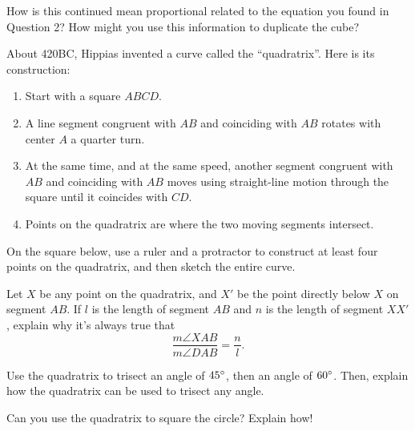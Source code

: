\documentclass[handout]{ximera}
\begin{document}
\begin{question}
How is this continued mean proportional related to the equation you found in Question 2?  How might you use this information to duplicate the cube?
\end{question}

\newpage

About 420BC, Hippias invented a curve called the ``quadratrix''.  Here is its construction:
\begin{enumerate}
    \item Start with a square $ABCD$.
    \item A line segment congruent with $AB$ and coinciding with $AB$ rotates with center $A$ a quarter turn.
    \item At the same time, and at the same speed, another segment congruent with $AB$ and coinciding with $AB$ moves using straight-line motion through the square until it coincides with $CD$.
    \item Points on the quadratrix are where the two moving segments intersect.
\end{enumerate}



\begin{question}
On the square below, use a ruler and a protractor to construct at least four points on the quadratrix, and then sketch the entire curve.
\begin{image}
\end{image}
\end{question}

\begin{question}
Let $X$ be any point on the quadratrix, and $X'$ be the point directly below $X$ on segment $AB$.  If $l$ is the length of segment $AB$ and $n$ is the length of segment $XX'$, explain why it's always true that 
\[
\frac{m\angle XAB}{m\angle DAB} = \frac{n}{l}.
\]
\end{question}

\begin{question}
Use the quadratrix to trisect an angle of $45\degree$, then an angle of $60\degree$.  Then, explain how the quadratrix can be used to trisect any angle.
\end{question}

\begin{question}
Can you use the quadratrix to square the circle?  Explain how!
\end{question}
\end{document}
